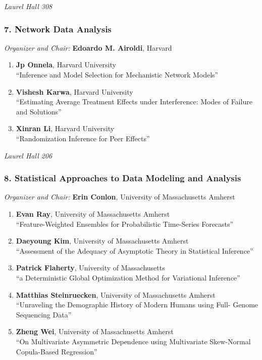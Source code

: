 \emph{Laurel Hall 308} \\[.5em]

\subsubsection*{7. Network Data Analysis}

\emph{Organizer and Chair:} \textbf{Edoardo M. Airoldi}, Harvard

\begin{enumerate}
\item \textbf{Jp Onnela}, Harvard University \\
``Inference and Model Selection for Mechanistic Network Models''
\item \textbf{Vishesh Karwa}, Harvard University \\
``Estimating Average Treatment Effects under Interference: Modes of Failure and Solutions''
\item \textbf{Xinran Li}, Harvard University \\
``Randomization Inference for Peer Effects''
\end{enumerate}

\emph{Laurel Hall 206} \\[.5em]

\subsubsection*{8. Statistical Approaches to Data Modeling and Analysis}

\emph{Organizer and Chair:} \textbf{Erin Conlon}, University of Massachusetts Amherst

\begin{enumerate}
\item \textbf{Evan Ray}, University of Massachusetts Amherst \\
``Feature-Weighted Ensembles for Probabilistic Time-Series Forecasts''
\item \textbf{Daeyoung Kim}, University of Massachusetts Amherst \\
``Assessment of the Adequacy of Asymptotic Theory in Statistical Inference''
\item \textbf{Patrick Flaherty}, University of Massachusetts \\
``a Deterministic Global Optimization Method for Variational Inference''
\item \textbf{Matthias Steinruecken}, University of Massachusetts Amherst \\
``Unraveling the Demographic History of Modern Humans using Full- Genome Sequencing Data''
\item \textbf{Zheng Wei}, University of Massachusetts Amherst \\
``On Multivariate Asymmetric Dependence using Multivariate Skew-Normal Copula-Based Regression''
\end{enumerate}

